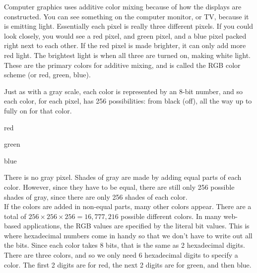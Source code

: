 Computer graphics uses additive color mixing because of how the displays are constructed. You can see something on the computer monitor, or TV, because it is emitting light. Essentially each pixel is really three different pixels. If you could look closely, you would see a red pixel, and green pixel, and a blue pixel packed right next to each other. If the red pixel is made brighter, it can only add more red light. The brightest light is when all three are turned on, making white light. These are the primary colors for additive mixing, and is called the RGB color scheme (or red, green, blue).\\

\begin{center}\end{center}

Just as with a gray scale, each color is represented by an 8-bit number, and so each color, for each pixel, has 256 possibilities: from black (off), all the way up to fully on for that color.\\

\begin{center}red\\ \end{center}
\begin{center}green\\ \end{center}
\begin{center}blue\\ \end{center}


There is no gray pixel. Shades of gray are made by adding equal parts of each color. However, since they have to be equal, there are still only 256 possible shades of gray, since there are only 256 shades of each color.\\

If the colors are added in non-equal parts, many other colors appear. There are a total of \(256\times256\times256 = 16,777,216 \) possible different colors. In many web-based applications, the RGB values are specified by the literal bit values. This is where hexadecimal numbers come in handy so that we don't have to write out all the bits. Since each color takes 8 bits, that is the same as 2 hexadecimal digits. There are three colors, and so we only need 6 hexadecimal digits to specify a color. The first 2 digits are for red, the next 2 digits are for green, and then blue.\\

